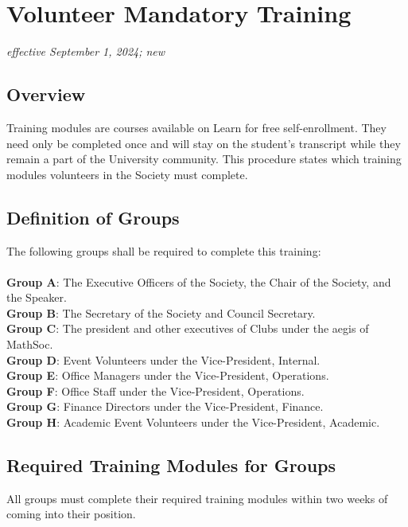 \section{Volunteer Mandatory Training}
\emph{effective September 1, 2024; new}

\subsection{Overview}

Training modules are courses available on Learn for free self-enrollment. They need only be
completed once and will stay on the student's transcript while they remain a part of the
University community. This procedure states which training modules volunteers in the
Society must complete.

\subsection{Definition of Groups}

The following groups shall be required to complete this training: \\
\\ \textbf{Group A}: The Executive Officers of the Society, the Chair of the Society, and the Speaker.
\\ \textbf{Group B}: The Secretary of the Society and Council Secretary.
\\ \textbf{Group C}: The president and other executives of Clubs under the aegis of MathSoc.
\\ \textbf{Group D}: Event Volunteers under the Vice-President, Internal.
\\ \textbf{Group E}: Office Managers under the Vice-President, Operations.
\\ \textbf{Group F}: Office Staff under the Vice-President, Operations.
\\ \textbf{Group G}: Finance Directors under the Vice-President, Finance.
\\ \textbf{Group H}: Academic Event Volunteers under the Vice-President, Academic.

\subsection{Required Training Modules for Groups}

All groups must complete their required training modules within two weeks of coming into their
position.

